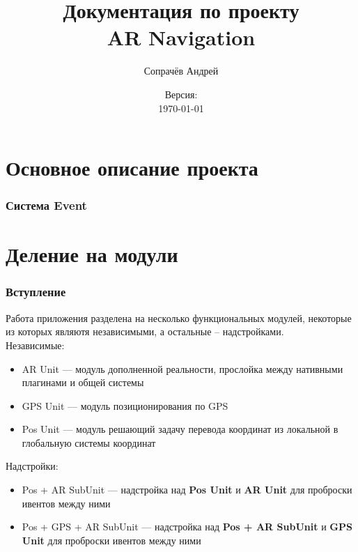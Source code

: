 \documentclass[a4paper, 11pt, titlepage]{article}
\title{Документация по проекту \\ \textbf{AR Navigation}}
\author{Сопрачёв Андрей}
\date{Версия: \versionnumber \\ \today}
\begin{document}
\sffamily
\maketitle

\tableofcontents
\newpage

\part{Основное описание проекта}
  \begin{center}
  \end{center}

  \section{Система Event}

  \lstset{style=sharpc}
  
    
\part{Деление на модули}
  \section{Вступление}
    Работа приложения разделена на несколько функциональных модулей, некоторые из которых являютя независимыми, а остальные -- надстройками.\\
    Независимые:
    \begin{itemize}
    \item AR Unit --- модуль дополненной реальности, прослойка между нативными плагинами и общей системы
    \item GPS Unit --- модуль позиционирования по GPS
    \item Pos Unit --- модуль решающий задачу перевода координат из локальной в глобальную системы координат
    \end{itemize}
    Надстройки:
    \begin{itemize}
    \item Pos + AR SubUnit --- надстройка над \textbf{Pos Unit} и \textbf{AR Unit} для проброски ивентов между ними
    \item Pos + GPS + AR SubUnit --- надстройка над \textbf{Pos + AR SubUnit} и \textbf{GPS Unit} для проброски ивентов между ними
    \end{itemize}
\end{document}
